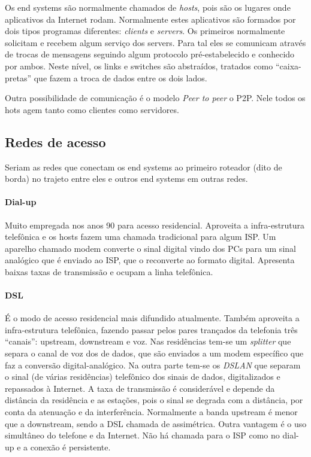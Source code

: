 Os end systems são normalmente chamados de \emph{hosts}, pois são os lugares onde aplicativos da Internet rodam.
Normalmente estes aplicativos são formados por dois tipos programas diferentes: \emph{clients} e \emph{servers}.
Os primeiros normalmente solicitam e recebem algum serviço dos servers.
Para tal eles se comunicam através de trocas de mensagens seguindo algum protocolo pré-estabelecido e conhecido por ambos.
Neste nível, os links e switches são abstraídos, tratados como ``caixa-pretas'' que fazem a troca de dados entre os dois lados.

Outra possibilidade de comunicação é o modelo \emph{Peer to peer} o P2P.
Nele todos os hots agem tanto como clientes como servidores.

\subsection{Redes de acesso}

Seriam as redes que conectam os end systems ao primeiro roteador (dito de borda) no trajeto entre eles e outros end systems em outras redes.

\paragraph{Dial-up} Muito empregada nos anos 90 para acesso residencial. Aproveita a infra-estrutura telefônica e os hosts fazem uma chamada tradicional para algum ISP. Um aparelho chamado modem converte o sinal digital vindo dos PCs para um sinal analógico que é enviado ao ISP, que o reconverte ao formato digital. Apresenta baixas taxas de transmissão e ocupam a linha telefônica.

\paragraph{DSL} É o modo de acesso residencial mais difundido atualmente. Também aproveita a infra-estrutura telefônica, fazendo passar pelos pares trançados da telefonia três ``canais'': upstream, downstream e voz. Nas residências tem-se um \emph{splitter} que separa o canal de voz dos de dados, que são enviados a um modem específico que faz a conversão digital-analógico. Na outra parte tem-se os \emph{DSLAN} que separam o sinal (de várias residências) telefônico dos sinais de dados, digitalizados e repassados à Internet. A taxa de transmissão é considerável e depende da distância da residência e as estações, pois o sinal se degrada com a distância, por conta da atenuação e da interferência. Normalmente a banda upstream é menor que a downstream, sendo a DSL chamada de assimétrica. Outra vantagem é o uso simultâneo do telefone e da Internet. Não há chamada para o ISP como no dial-up e a conexão é persistente.

